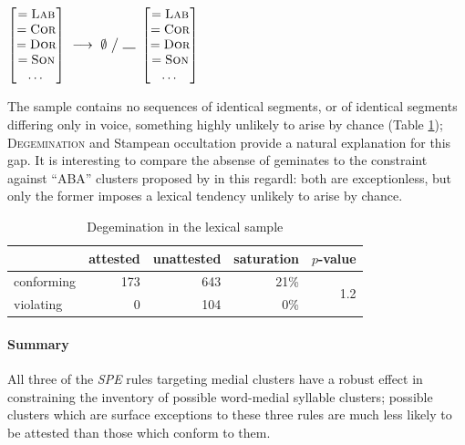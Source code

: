 \begin{example}
$\begin{bmatrix} =\textsc{Lab} \\ =\textsc{Cor} \\ =\textsc{Dor} \\ =\textsc{Son} \\ \ldots{} \end{bmatrix}~\goesto~\emptyset~\big /~\gap~\begin{bmatrix} =\textsc{Lab} \\ =\textsc{Cor} \\ =\textsc{Dor} \\ =\textsc{Son} \\ \ldots{} \end{bmatrix}$
\end{example}

\noindent
The sample contains no sequences of identical segments, or of identical segments differing only in voice, something highly unlikely to arise by chance (Table \ref{degemtab}); \textsc{Degemination} and Stampean occultation provide a natural explanation for this gap.
It is interesting to compare the absense of geminates to the constraint against ``ABA'' clusters proposed by \citeauthor{Pierrehumbert1994} in this regardl: both are exceptionless, but only the former imposes a lexical tendency unlikely to arise by chance.

\begin{table}
\centering
\begin{tabular}{l rrrr}
\toprule
           & attested & unattested & saturation & $p$-value \\
\midrule
conforming & 173      & 643        & 21\%       & \multirow{2}{*}{1.2\e{-10}} \\
violating  & 0        & 104        & 0\%        \\
\bottomrule
\end{tabular}
\caption{Degemination in the lexical sample}
\label{degemtab}
\end{table}


\paragraph{Summary} All three of the \emph{SPE} rules targeting medial clusters have a robust effect in constraining the inventory of possible word-medial syllable clusters; possible clusters which are surface exceptions to these three rules are much less likely to be attested than those which conform to them.

